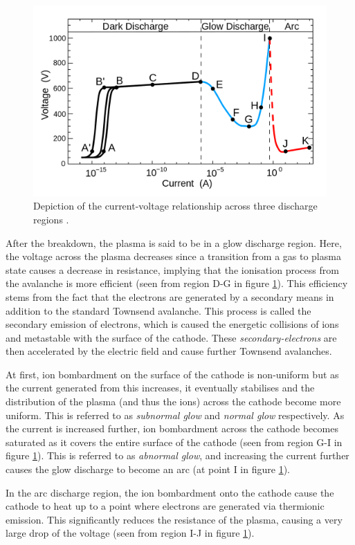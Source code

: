 \begin{figure}[h!]
	\centering
	\includegraphics[width=0.8\linewidth]{chapter_2/figures/dc_discharge.png}
	\caption{Depiction of the current-voltage relationship across three discharge regions \cite{Gallo1975}.}
	\label{fig:dc_discharge}
\end{figure}

After the breakdown, the plasma is said to be in a glow discharge region. Here, the voltage across the plasma decreases since a transition from a gas to plasma state causes a decrease in resistance, implying that the ionisation process from the avalanche is more efficient (seen from region D-G in figure \ref{fig:dc_discharge}). This efficiency stems from the fact that the electrons are generated by a secondary means in addition to the standard Townsend avalanche. This process is called the secondary emission of electrons, which is caused the energetic collisions of ions and metastable with the surface of the cathode. These \textit{secondary-electrons} are then accelerated by the electric field and cause further Townsend avalanches.

At first, ion bombardment on the surface of the cathode is non-uniform but as the current generated from this increases, it eventually stabilises and the distribution of the plasma (and thus the ions) across the cathode become more uniform. This is referred to as \textit{subnormal glow} and \textit{normal glow} respectively. As the current is increased further, ion bombardment across the cathode becomes saturated as it covers the entire surface of the cathode (seen from region G-I in figure \ref{fig:dc_discharge}). This is referred to as \textit{abnormal glow}, and increasing the current further causes the glow discharge to become an arc (at point I in figure \ref{fig:dc_discharge}).

In the arc discharge region, the ion bombardment onto the cathode cause the cathode to heat up to a point where electrons are generated via thermionic emission. This significantly reduces the resistance of the plasma, causing a very large drop of the voltage (seen from region I-J in figure \ref{fig:dc_discharge}). 

